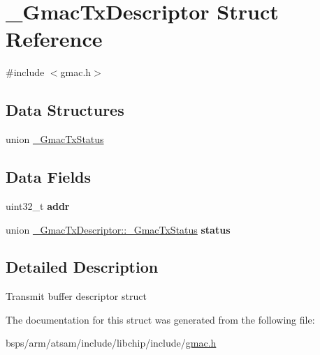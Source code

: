\hypertarget{struct__GmacTxDescriptor}{}\section{\+\_\+\+Gmac\+Tx\+Descriptor Struct Reference}
\label{struct__GmacTxDescriptor}


{\ttfamily \#include $<$gmac.\+h$>$}

\subsection*{Data Structures}
\begin{DoxyCompactItemize}
\item 
union \mbox{\hyperlink{union__GmacTxDescriptor_1_1__GmacTxStatus}{\+\_\+\+Gmac\+Tx\+Status}}
\end{DoxyCompactItemize}
\subsection*{Data Fields}
\begin{DoxyCompactItemize}
\item 
uint32\+\_\+t {\bfseries addr}
\item 
union \mbox{\hyperlink{union__GmacTxDescriptor_1_1__GmacTxStatus}{\+\_\+\+Gmac\+Tx\+Descriptor\+::\+\_\+\+Gmac\+Tx\+Status}} {\bfseries status}
\end{DoxyCompactItemize}


\subsection{Detailed Description}
Transmit buffer descriptor struct 

The documentation for this struct was generated from the following file\+:\begin{DoxyCompactItemize}
\item 
bsps/arm/atsam/include/libchip/include/\mbox{\hyperlink{gmac_8h}{gmac.\+h}}\end{DoxyCompactItemize}
